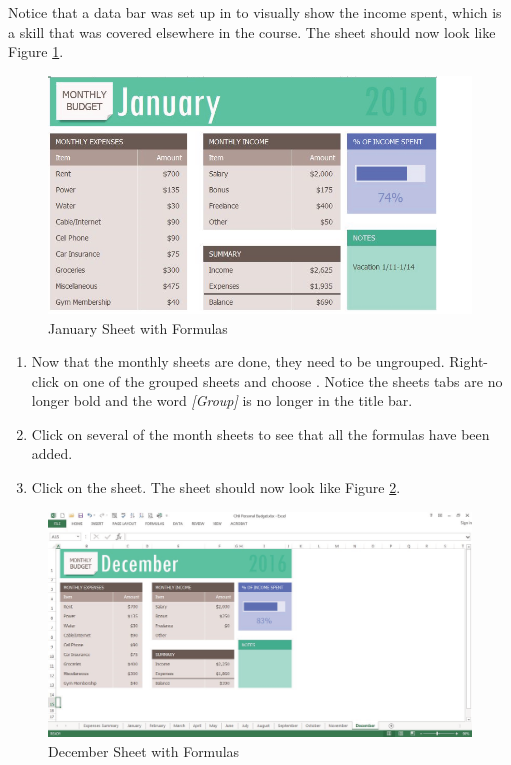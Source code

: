 Notice that a data bar was set up in  to visually show the income spent, which is a skill that was covered elsewhere in the course. The  sheet should now look like Figure \ref{06:fig05}.

\begin{figure}[H]
	\centering
	\includegraphics[width=\maxwidth{.95\linewidth}]{gfx/ch06_fig05}
	\caption{January Sheet with Formulas}
	\label{06:fig05}
\end{figure}

\begin{enumerate}[resume]
	\item Now that the monthly sheets are done, they need to be ungrouped. Right-click on one of the grouped sheets and choose . Notice the sheets tabs are no longer bold and the word \textit{[Group]} is no longer in the title bar.
	\item Click on several of the month sheets to see that all the formulas have been added.
	\item Click on the  sheet. The sheet should now look like Figure \ref{06:fig06}.
\end{enumerate}

\begin{figure}[H]
	\centering
	\includegraphics[width=\maxwidth{.95\linewidth}]{gfx/ch06_fig06}
	\caption{December Sheet with Formulas}
	\label{06:fig06}
\end{figure}

